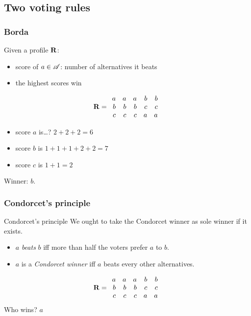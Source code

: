 \documentclass[french,english]{beamer}
\begin{document}
\subsection{Two voting rules}
\begin{frame}
	\frametitle{Borda}
	
Given a profile $\mathbf{R}$:
	\begin{itemize}
		\item score of $a \in \mathscr{A}$: number of alternatives it beats
		\item the highest scores win
	\end{itemize}
	
	\begin{equation}
		\mathbf{R} =
		\begin{array}{rrrrr}
			a	&	a	&	a	&	b	&	b\\
			b	&	b	&	b	&	c	&	c\\
			c	&	c	&	c	&	a	&	a
		\end{array}
	\end{equation}
	\begin{itemize}
		\item score $a$ is\dots? \pause $2 + 2 + 2 = 6$
		\item score $b$ is $1 + 1 + 1 + 2 + 2 = 7$
		\item score $c$ is $1 + 1 = 2$
	\end{itemize}
	Winner: $b$.
\end{frame}

\begin{frame}
	\frametitle{Condorcet’s principle}
	\begin{block}{Condorcet’s principle}
		We ought to take the Condorcet winner as sole winner if it exists.
		\begin{itemize}
			\item $a$ \emph{beats} $b$ iff more than half the voters prefer $a$ to $b$.
			\item $a$ is a \emph{Condorcet winner} iff $a$ beats every other alternatives.
		\end{itemize}
	\end{block}
	\vfill
	\begin{equation}
		\mathbf{R} =
		\begin{array}{rrrrr}
			a	&	a	&	a	&	b	&	b\\
			b	&	b	&	b	&	c	&	c\\
			c	&	c	&	c	&	a	&	a
		\end{array}
	\end{equation}
	 Who wins? \pause $a$
\end{frame}
\end{document}
